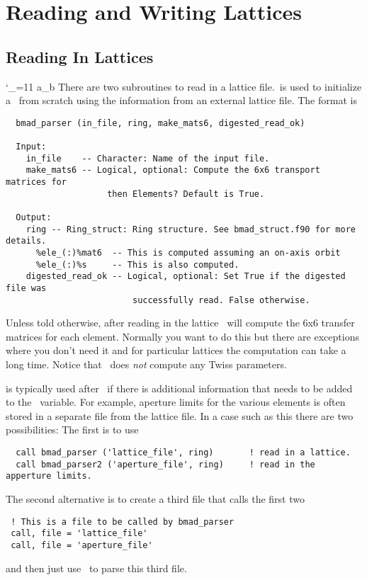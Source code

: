 \chapter{Reading and Writing Lattices}

\section{Reading In Lattices}

{\catcode`\_=11 a_b}
There are two subroutines to read in a lattice file.\bmadparser\ is
used to initialize a \ringstruct\ from scratch using the information
from an external lattice file. The format is
\begin{verbatim}
  bmad_parser (in_file, ring, make_mats6, digested_read_ok) 

  Input:
    in_file    -- Character: Name of the input file.
    make_mats6 -- Logical, optional: Compute the 6x6 transport matrices for 
                    then Elements? Default is True.
 
  Output:
    ring -- Ring_struct: Ring structure. See bmad_struct.f90 for more details.
      %ele_(:)%mat6  -- This is computed assuming an on-axis orbit
      %ele_(:)%s     -- This is also computed.
    digested_read_ok -- Logical, optional: Set True if the digested file was
                         successfully read. False otherwise.
\end{verbatim}
Unless told otherwise, after reading in the lattice \bmadparser\ will
compute the 6x6 transfer matrices for each element. Normally you want
to do this but there are exceptions where you don't need it and for
particular lattices the computation can take a long time. Notice that
\bmadparser\ does {\em not} compute any Twiss parameters.

 is typically used after \bmadparser\ if there is 
additional information that needs to be added to the \ringstruct\
variable.  For example, aperture limits for the various elements is often
stored in a separate file from the lattice file. In a case such as this
there are two possibilities: The first is to use \sn{bmad\_parser2} 
\begin{verbatim}
  call bmad_parser ('lattice_file', ring)       ! read in a lattice.
  call bmad_parser2 ('aperture_file', ring)     ! read in the apperture limits.
\end{verbatim}
The second alternative is to create a third file that calls the first two
\begin{verbatim}
 ! This is a file to be called by bmad_parser
 call, file = 'lattice_file'
 call, file = 'aperture_file'
\end{verbatim}
and then just use \bmadparser\ to parse this third file.


